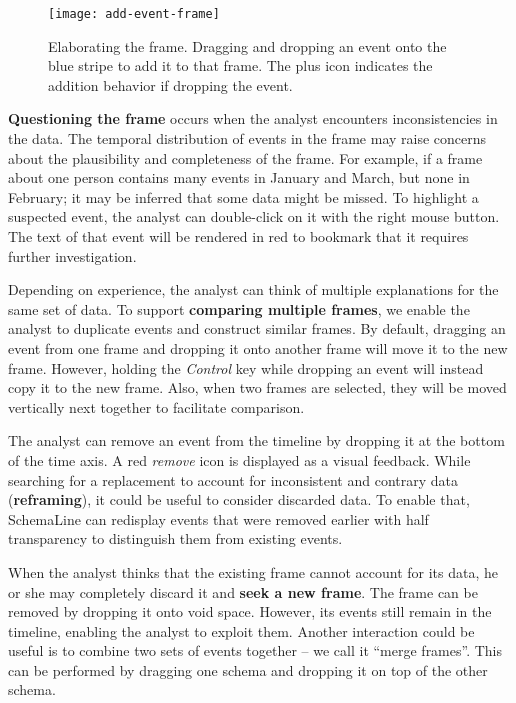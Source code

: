 \begin{figure}[!htb]
	\centering
	\texttt{[image: add-event-frame]}
	\caption[Elaborating the frame]{Elaborating the frame. Dragging and dropping an event onto the blue stripe to add it to that frame. The plus icon indicates the addition behavior if dropping the event.}
	\label{fig:add-event-frame}
\end{figure}

\textbf{Questioning the frame} occurs when the analyst encounters inconsistencies in the data. The temporal distribution of events in the frame may raise concerns about the plausibility and completeness of the frame. For example, if a frame about one person contains many events in January and March, but none in February; it may be inferred that some data might be missed. To highlight a suspected event, the analyst can double-click on it with the right mouse button. The text of that event will be rendered in red to bookmark that it requires further investigation. 

Depending on experience, the analyst can think of multiple explanations for the same set of data. To support \textbf{comparing multiple frames}, we enable the analyst to duplicate events and construct similar frames. By default, dragging an event from one frame and dropping it onto another frame will move it to the new frame. However, holding the \emph{Control} key while dropping an event will instead copy it to the new frame. Also, when two frames are selected, they will be moved vertically next together to facilitate comparison.

The analyst can remove an event from the timeline by dropping it at the bottom of the time axis. A red \emph{remove} icon is displayed as a visual feedback. While searching for a replacement to account for inconsistent and contrary data (\textbf{reframing}), it could be useful to consider discarded data. To enable that, SchemaLine can redisplay events that were removed earlier with half transparency to distinguish them from existing events.

When the analyst thinks that the existing frame cannot account for its data, he or she may  completely discard it and \textbf{seek a new frame}. The frame can be removed by dropping it onto void space. However, its events still remain in the timeline, enabling the analyst to exploit them. Another interaction could be useful is to combine two sets of events together -- we call it ``merge frames''. This can be performed by dragging one schema and dropping it on top of the other schema.